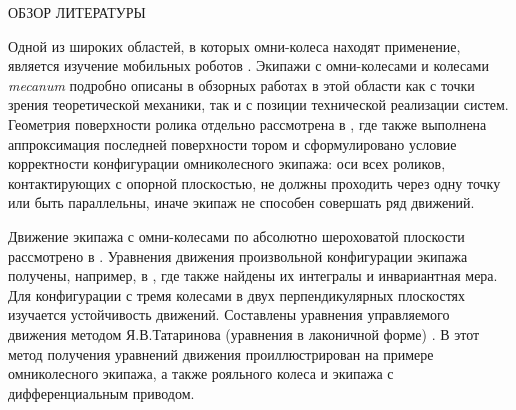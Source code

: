 ОБЗОР ЛИТЕРАТУРЫ


Одной из широких областей, в которых омни-колеса находят применение, является изучение мобильных роботов \cite{Seeni2010,Martynenko2005,Martynenko2007,GolubevSnake2004}. Экипажи с омни-колесами и колесами \textit{mecanum} \cite{Ilon} подробно описаны в обзорных работах в этой области \cite{Campion1996,Zimmermann2009,ChungIagnemma2016,Kanjanawanishkul2015,Adascalitei2011} как с точки зрения теоретической механики, так и с позиции технической реализации систем. Геометрия поверхности ролика отдельно рассмотрена в \cite{Gfrerrer2008}, где также выполнена аппроксимация последней поверхности тором и сформулировано условие корректности конфигурации омниколесного экипажа: оси всех роликов, контактирующих с опорной плоскостью, не должны проходить через одну точку или быть параллельны, иначе экипаж не способен совершать ряд движений.

Движение экипажа с омни-колесами по абсолютно шероховатой плоскости рассмотрено в \cite{ZobovaTatarinovAspecty2006,ZobovaTatarinov2009,zobova2008svobodnye8020851,ZobovaTatarinovPMM,Zobova2011e}. Уравнения движения произвольной конфигурации экипажа получены, например, в \cite{ZobovaTatarinov2009}, где также найдены их интегралы и инвариантная мера. Для конфигурации с тремя колесами в двух перпендикулярных плоскостях изучается устойчивость движений. Составлены уравнения управляемого движения методом Я.В.Татаринова (уравнения в лаконичной форме) \cite{Tatarinov,Tatarinov2005}. В \cite{Zobova2011} этот метод получения уравнений движения  проиллюстрирован на примере омниколесного экипажа, а также рояльного колеса и экипажа с дифференциальным приводом.

